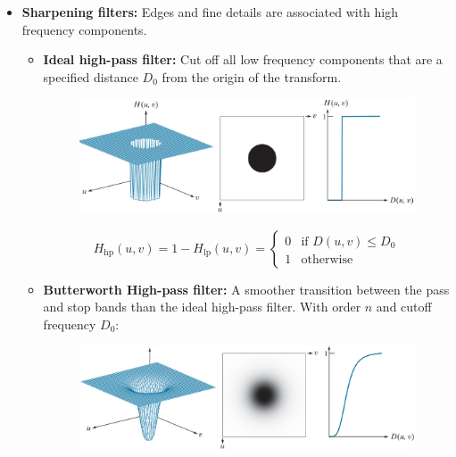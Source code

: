\begin{itemize}
  \item \textbf{Sharpening filters:} Edges and fine details are associated with high frequency components.

    \begin{itemize}
      \item \textbf{Ideal high-pass filter:} Cut off all low frequency components that are a specified distance $D_0$ from the origin of the transform.

        \begin{minipage}{\linewidth}
          \begin{figure}[H]
            \centering
            \includegraphics[width=\linewidth]{images/ideal_high_pass.png}
          \end{figure}
        \end{minipage}

        \begin{equation*}
          H_\text{hp}(u, v) = 1 - H_\text{lp}(u, v) =
          \begin{cases}
            0 & \text{if } D(u, v) \leq D_0 \\
            1 & \text{otherwise}
          \end{cases}
        \end{equation*}

      \item \textbf{Butterworth High-pass filter:} A smoother
        transition between the pass and stop bands than the ideal high-pass
        filter. With order $n$ and cutoff frequency $D_0$:

        \begin{minipage}{\linewidth}
          \begin{figure}[H]
            \centering
            \includegraphics[width=\linewidth]{images/butterworth_high_pass.png}
          \end{figure}
        \end{minipage}


\end{itemize}
\end{itemize}
